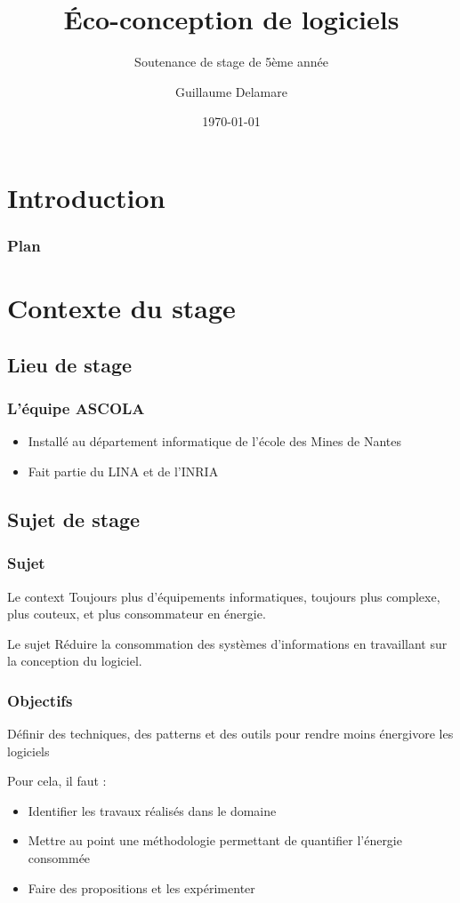 \documentclass{beamer}
\title{Éco-conception de logiciels}
\subtitle{Soutenance de stage de 5ème année}
\author{Guillaume Delamare}
\institute[Universities of]
{
Équipe ASCOLA\\
Laboratoire d'informatique de Nantes Atlantiques\\
École des Mines de Nantes\\
}
\date{\today}
\begin{document}
	\begin{frame}
		\titlepage
	\end{frame}

	\section*{Introduction}
		\begin{frame}
			\frametitle{Plan}
			\tableofcontents[hideallsubsections]
		\end{frame}

	\section{Contexte du stage}
		\subsection{Lieu de stage}
			\begin{frame}
				\frametitle{L'équipe ASCOLA}
				\begin{itemize}
					\item Installé au département informatique de l'école des Mines de Nantes
					\item Fait partie du LINA et de l'INRIA 
				\end{itemize}
			\end{frame}
			
		\subsection{Sujet de stage}
			\begin{frame}
				\frametitle{Sujet}
					\begin{block}{Le context}
						Toujours plus d'équipements informatiques, toujours plus complexe, plus couteux, et plus consommateur en énergie.
					\end{block}
					\begin{block}{Le sujet}
						Réduire la consommation des systèmes d'informations  en travaillant sur la conception du logiciel.
					\end{block}
			\end{frame}
			\begin{frame}
				\frametitle{Objectifs}
				
				Définir des techniques, des patterns et des outils pour rendre moins énergivore les logiciels
			    \begin{block}{Pour cela, il faut :}
				    \begin{itemize}
						\item Identifier les travaux réalisés dans le domaine
						\item Mettre au point une méthodologie permettant de quantifier l'énergie consommée
						\item Faire des propositions et les expérimenter
				    \end{itemize}
			    \end{block}
			\end{frame}
		
\end{document}
